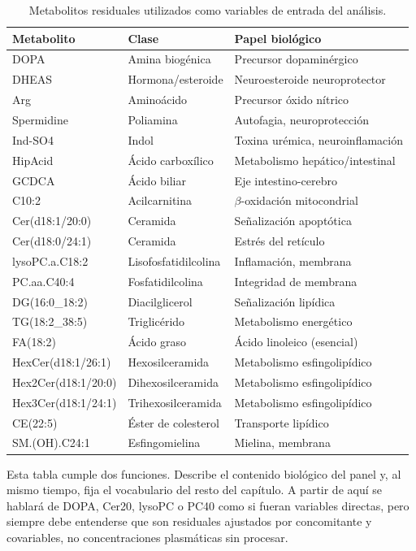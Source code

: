 \begin{table}[ht]
\centering
\caption{Metabolitos residuales utilizados como variables de entrada del análisis.}
\label{tab:metabolitos}
\small
\begin{tabular}{lll}
\hline
\textbf{Metabolito} & \textbf{Clase} & \textbf{Papel biológico} \\
\hline
DOPA & Amina biogénica & Precursor dopaminérgico \\
DHEAS & Hormona/esteroide & Neuroesteroide neuroprotector \\
Arg & Aminoácido & Precursor óxido nítrico \\
Spermidine & Poliamina & Autofagia, neuroprotección \\
Ind-SO4 & Indol & Toxina urémica, neuroinflamación \\
HipAcid & Ácido carboxílico & Metabolismo hepático/intestinal \\
GCDCA & Ácido biliar & Eje intestino-cerebro \\
C10:2 & Acilcarnitina & $\beta$-oxidación mitocondrial \\
Cer(d18:1/20:0) & Ceramida & Señalización apoptótica \\
Cer(d18:0/24:1) & Ceramida & Estrés del retículo \\
lysoPC.a.C18:2 & Lisofosfatidilcolina & Inflamación, membrana \\
PC.aa.C40:4 & Fosfatidilcolina & Integridad de membrana \\
DG(16:0\_18:2) & Diacilglicerol & Señalización lipídica \\
TG(18:2\_38:5) & Triglicérido & Metabolismo energético \\
FA(18:2) & Ácido graso & Ácido linoleico (esencial) \\
HexCer(d18:1/26:1) & Hexosilceramida & Metabolismo esfingolipídico \\
Hex2Cer(d18:1/20:0) & Dihexosilceramida & Metabolismo esfingolipídico \\
Hex3Cer(d18:1/24:1) & Trihexosilceramida & Metabolismo esfingolipídico \\
CE(22:5) & Éster de colesterol & Transporte lipídico \\
SM.(OH).C24:1 & Esfingomielina & Mielina, membrana \\
\hline
\end{tabular}
\end{table}

Esta tabla cumple dos funciones. Describe el contenido biológico del panel y, al mismo tiempo, fija el vocabulario del
resto del capítulo. A partir de aquí se hablará de DOPA, Cer20, lysoPC o PC40 como si fueran variables directas, pero
siempre debe entenderse que son residuales ajustados por concomitante y covariables, no concentraciones plasmáticas sin
procesar.

